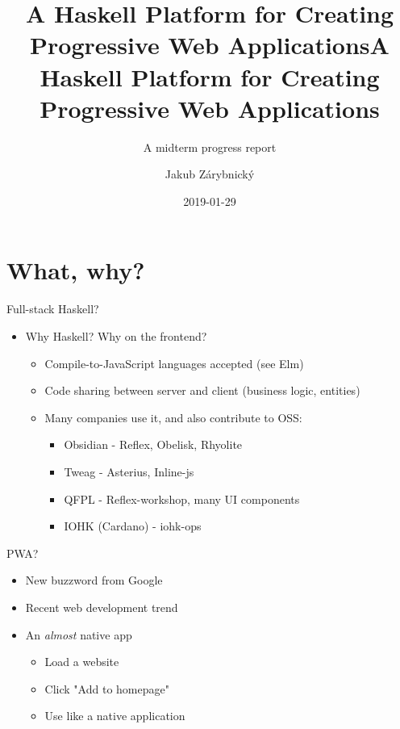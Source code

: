 \documentclass[presentation]{beamer}
\author{Jakub Zárybnický}
\date{2019-01-29}
\title{A Haskell Platform for Creating Progressive Web Applications}
\subtitle{A midterm progress report}
\title[PWAs in Haskell]{A Haskell Platform for Creating Progressive Web Applications}
\begin{document}
\maketitle

\section{What, why?}
\label{sec:org5fc6903}
\begin{frame}[label={sec:orgea2542e}]{Full-stack Haskell?}
\begin{itemize}
\item Why Haskell? Why on the frontend?     \pause
\begin{itemize}
\item Compile-to-JavaScript languages accepted (see Elm)
\item Code sharing between server and client (business logic, entities)    \pause
\item Many companies use it, and also contribute to OSS:
\begin{itemize}
\item Obsidian - Reflex, Obelisk, Rhyolite
\item Tweag - Asterius, Inline-js
\item QFPL - Reflex-workshop, many UI components
\item IOHK (Cardano) - iohk-ops
\end{itemize}
\end{itemize}
\end{itemize}
\end{frame}

\begin{frame}[label={sec:org3c10d16}]{PWA?}
\begin{itemize}
\item New buzzword from Google
\item Recent web development trend
\item An \emph{almost} native app
\begin{itemize}
\item Load a website
\item Click "Add to homepage"
\item Use like a native application
\end{itemize}
\end{itemize}
\end{frame}
\end{document}
